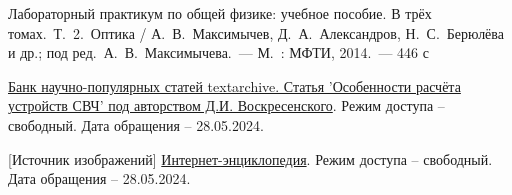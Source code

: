 \documentclass[a4paper, 14pt]{article}
\begin{document}
     {}
    \begin{thebibliography}{}
        
         Лабораторный практикум по общей физике: учебное пособие.
        В трёх томах.~Т.~2.~Оптика / А.~В.~Максимычев, Д.~А.~Александров, Н.~С.~Берюлёва и др.;
        под ред.~А.~В.~Максимычева.~— М.~: МФТИ, 2014.~— 446 с
        
         \href{https://textarchive.ru/c-2236776.html}{Банк научно-популярных статей textarchive.
        Статья 'Особенности расчёта устройств СВЧ' под авторством Д.И. Воскресенского}.
        Режим доступа -- свободный.
        Дата обращения -- 28.05.2024.
        
         [Источник изображений] \href{https://ru.wikipedia.org/wiki/Оптическое_волокно}
        {Интернет-энциклопедия}.
        Режим доступа -- свободный.
        Дата обращения -- 28.05.2024.
    
    \end{thebibliography}
\end{document}
